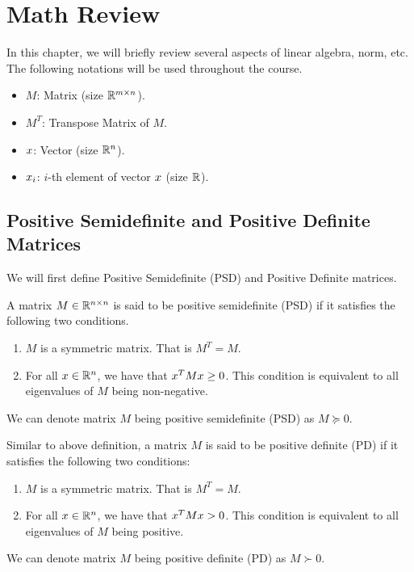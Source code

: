 \documentclass[../main.tex]{subfiles}
\begin{document}
\chapter{Math Review}

In this chapter, we will briefly review several aspects of linear algebra, norm, etc. The following notations will be used throughout the course.

\begin{itemize}
	\item $M$: Matrix (size $\mathbb{R}^{m \times n}$).
	\item $M^T$: Transpose Matrix of $M$.
	\item $x$: Vector (size $\mathbb{R}^n$).
	\item $x_i$: $i$-th element of vector $x$ (size $\mathbb{R}$).
\end{itemize}

\section{Positive Semidefinite and Positive Definite Matrices}
We will first define Positive Semidefinite (PSD) and Positive Definite matrices.

\begin{definition}
	
	A matrix $M\in \mathbb{R}^{n\times n}$ is said to be positive semidefinite (PSD) if it satisfies the following two conditions.
	
	\begin{enumerate}
		\item $M$ is a symmetric matrix. That is $M^T = M$.
		\item For all $x \in \mathbb{R}^n$, we have that $x^T M x \geq 0$. This condition is equivalent to all eigenvalues of $M$ being non-negative.
	\end{enumerate}

	We can denote matrix $M$ being positive semidefinite (PSD) as $M \succeq 0$.
\end{definition}

\begin{definition}
	Similar to above definition, a matrix $M$ is said to be positive definite (PD) if it satisfies the following two conditions:
	
	\begin{enumerate}
		\item $M$ is a symmetric matrix. That is $M^T = M$.
		\item For all $x \in \mathbb{R}^n$, we have that $x^T M x > 0$. This condition is equivalent to all eigenvalues of $M$ being positive.
	\end{enumerate}

	We can denote matrix $M$ being positive definite (PD) as $M \succ 0$.
\end{definition}
\end{document}
